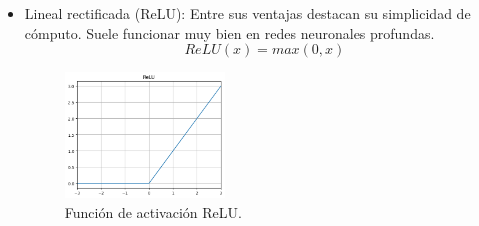 \begin{itemize}
    \item Lineal rectificada (ReLU): Entre sus ventajas destacan su simplicidad de cómputo. Suele funcionar muy bien en redes neuronales profundas.
    \begin{equation}
        ReLU(x) = max(0,x)
    \end{equation}
    \begin{figure}[htbp]
        \centering
        \includegraphics[width=0.4\textwidth]{img/img23.png}
        \caption{Función de activación ReLU.}
        \label{fig:img23}
    \end{figure}
    

\end{itemize}
